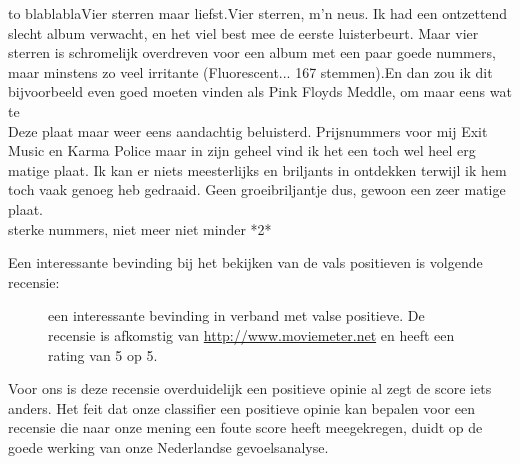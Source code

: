 \begin{table}[H]
\centering
\begin{tabu} to \textwidth {|X|}
\hline
blablablaVier sterren maar liefst.Vier sterren, m'n neus. Ik had een ontzettend slecht album verwacht, en het viel best mee de eerste luisterbeurt. Maar vier sterren is schromelijk overdreven voor een album met een paar goede nummers, maar minstens zo veel irritante (Fluorescent... 167 stemmen).En dan zou ik dit bijvoorbeeld even goed moeten vinden als Pink Floyds Meddle, om maar eens wat te \\ \hline
Deze plaat maar weer eens aandachtig beluisterd. Prijsnummers voor mij Exit Music en Karma Police maar in zijn geheel vind ik het een toch wel heel erg matige plaat. Ik kan er niets meesterlijks en briljants in ontdekken terwijl ik hem toch vaak genoeg heb gedraaid. Geen groeibriljantje dus, gewoon een zeer matige plaat.                                                                         \\  sterke nummers, niet meer niet minder *2*                                                                                                                                                                                                                                                                                                                                                                \\ \hline
\end{tabu}
\caption{Enkele vals positieven uit de muziekdataset}
\end{table}

Een interessante bevinding bij het bekijken van de vals positieven is volgende recensie:

\begin{figure}[H]%
    \centering
    \caption{een interessante bevinding in verband met valse positieve. De recensie is afkomstig van \url{http://www.moviemeter.net} en heeft een rating van 5 op 5. }
\end{figure}

Voor ons is deze recensie overduidelijk een positieve opinie al zegt de score iets anders. Het feit dat onze classifier een positieve opinie kan bepalen voor een recensie die naar onze mening een foute score heeft meegekregen, duidt op de goede werking van onze Nederlandse gevoelsanalyse.


